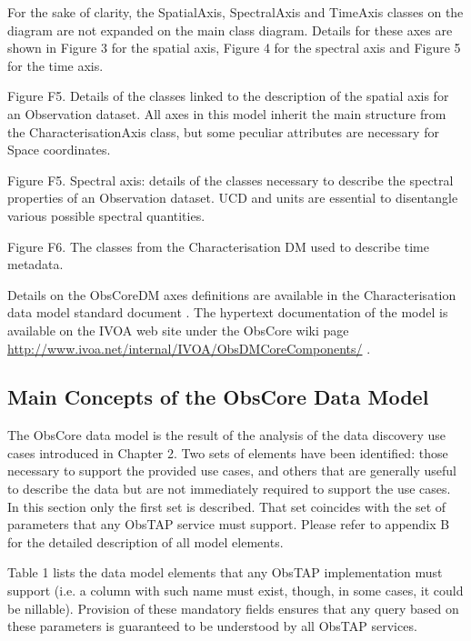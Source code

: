 \documentclass[11pt,a4paper]{ivoa}
\begin{document}
For the sake of clarity, the SpatialAxis, SpectralAxis and TimeAxis classes on the diagram are not expanded on the main
class diagram. Details for these axes are shown in Figure 3 for the spatial axis, Figure 4 for the spectral axis and
Figure 5 for the time axis.

\label{bkm:Ref158037577}Figure F5. Details of the classes linked to the description of the
spatial axis for an Observation dataset. All axes in this model inherit the main structure from the
CharacterisationAxis class, but some peculiar attributes are necessary for Space coordinates.

\label{bkm:Ref158037643}Figure F5. Spectral axis: details of the classes necessary to
describe the spectral properties of an Observation dataset. UCD and units are essential to disentangle various possible
spectral quantities.

\label{bkm:Ref291003095}Figure F6.  The classes from the Characterisation DM used to
describe time metadata.

Details on the ObsCoreDM axes definitions are available in the Characterisation data model standard document
\citep{2008ivoa.spec.0325L}. The hypertext documentation of the model is available on the IVOA web site under the
ObsCore wiki page  \url{http://www.ivoa.net/internal/IVOA/ObsDMCoreComponents/} .

\subsection[Main Concepts of the ObsCore Data Model]{Main Concepts of the ObsCore Data Model}
The ObsCore data model is the result of the analysis of the data discovery use cases introduced in Chapter 2. Two sets
of elements have been identified: those necessary to support the provided use cases, and others that are generally
useful to describe the data but are not immediately required to support the use cases.  In this section only the first
set is described.  That set coincides with the set of parameters that any ObsTAP service must support. Please refer to
appendix B for the detailed description of all model elements. 

Table 1 lists the data model elements that any ObsTAP implementation must support (i.e. a column with such name must
exist, though, in some cases, it could be nillable).  Provision of these mandatory fields ensures that any query based
on these parameters is guaranteed to be understood by all ObsTAP services.
\end{document}
